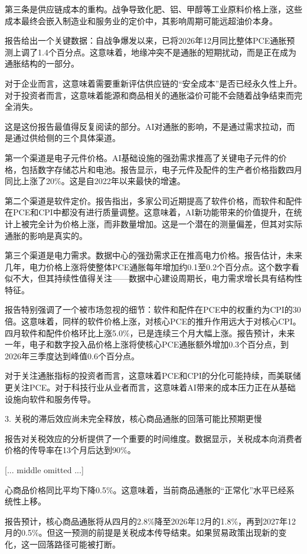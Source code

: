 \documentclass[11pt]{ctexart}
\begin{document}
第三条是供应链成本的重构。战争导致化肥、铝、甲醇等工业原料价格上涨，这些成本最终会嵌入制造业和服务业的定价中，其影响周期可能远超油价本身。

报告给出一个关键数据：自战争爆发以来，已将2026年12月同比整体PCE通胀预测上调了1.4个百分点。这意味着，地缘冲突不是通胀的短期扰动，而是正在成为通胀结构的一部分。

对于企业而言，这意味着需要重新评估供应链的“安全成本”是否已经永久性上升。对于投资者而言，这意味着能源和商品相关的通胀溢价可能不会随着战争结束而完全消失。

这是这份报告最值得反复阅读的部分。AI对通胀的影响，不是通过需求拉动，而是通过供给侧的三个具体渠道。

第一个渠道是电子元件价格。AI基础设施的强劲需求推高了关键电子元件的价格，包括数字存储芯片和电池。报告显示，电子元件及配件的生产者价格指数四月同比上涨了20\%。这是自2022年以来最快的增速。

第二个渠道是软件定价。报告指出，多家公司近期提高了软件价格，而软件和配件在PCE和CPI中都没有进行质量调整。这意味着，AI新功能带来的价值提升，在统计上被完全计为价格上涨，而非数量增加。这是一个潜在的测量偏差，但其对实际通胀的影响是真实的。

第三个渠道是电力需求。数据中心的强劲需求正在推高电力价格。报告估计，未来几年，电力价格上涨将使整体PCE通胀每年增加约0.1至0.2个百分点。这个数字看似不大，但其持续性值得关注——数据中心建设周期长，电力需求增长具有结构性特征。

报告特别强调了一个被市场忽视的细节：软件和配件在PCE中的权重约为CPI的30倍。这意味着，同样的软件价格上涨，对核心PCE的推升作用远大于对核心CPI。四月软件和配件价格环比上涨5.0\%，已是连续三个月大幅上涨。报告预计，未来一年，电子和数字投入品价格上涨将使核心PCE通胀额外增加0.3个百分点，到2026年三季度达到峰值0.6个百分点。

对于关注通胀指标的投资者而言，这意味着PCE和CPI的分化可能持续，而美联储更关注PCE。对于科技行业从业者而言，这意味着AI带来的成本压力正在从基础设施向软件和服务传导。

3. 关税的滞后效应尚未完全释放，核心商品通胀的回落可能比预期更慢

报告对关税效应的分析提供了一个重要的时间维度。数据显示，关税成本向消费者价格的传导率在13个月后达到90\%。

[... middle omitted ...]

心商品价格同比平均下降0.5\%。这意味着，当前商品通胀的“正常化”水平已经系统性上移。

报告预计，核心商品通胀将从四月的2.8\%降至2026年12月的1.8\%，再到2027年12月的0.5\%。但这一预测的前提是关税成本传导结束。如果贸易政策出现新的变化，这一回落路径可能被打断。
\end{document}
